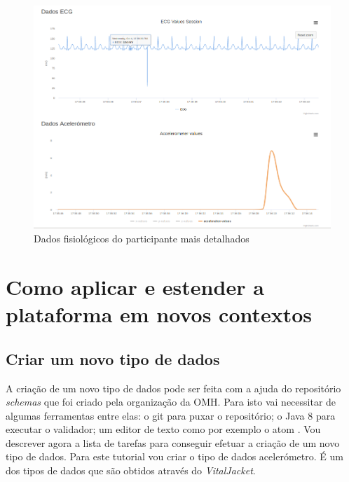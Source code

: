  \begin{figure}[H]
\centering
\includegraphics[width=1\textwidth]{imgs/withzoom-choosen-web.png}
\caption[Dados fisiológicos do participante mais detalhados]{Dados fisiológicos do participante mais detalhados}
\label{f:withzoom}
 \end{figure}
\section{Como aplicar e estender a plataforma em novos contextos}


\subsection{Criar um novo tipo de dados}

A criação de um novo tipo de dados pode ser feita com a ajuda do repositório \textit{schemas} \cite{schemas-rep} que foi criado pela organização da \gls{OMH}. Para isto vai necessitar de algumas ferramentas entre elas: o git \cite{git-install} para puxar o repositório; o Java 8 \cite{java-overview} para executar o validador; um editor de texto como por exemplo o atom \cite{atom-install}. Vou descrever agora a lista de tarefas para conseguir efetuar a criação de um novo tipo de dados. Para este tutorial vou criar o tipo de dados acelerómetro. É um dos tipos de dados que são obtidos através do \textit{VitalJacket}.

